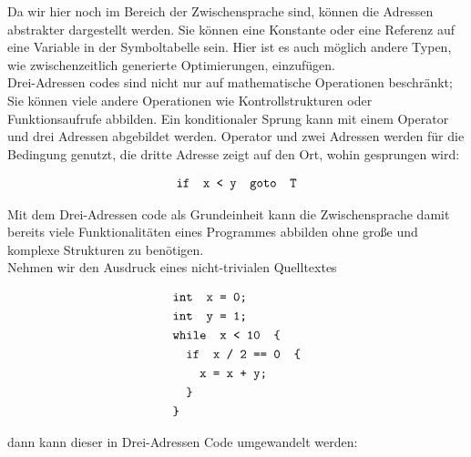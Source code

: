 Da wir hier noch im Bereich der Zwischensprache sind, können die Adressen abstrakter dargestellt werden.
Sie können eine Konstante oder eine Referenz auf eine Variable in der Symboltabelle sein.
Hier ist es auch möglich andere Typen, wie zwischenzeitlich generierte Optimierungen, einzufügen\cite{aho:2006}.\\

Drei-Adressen codes sind nicht nur auf mathematische Operationen beschränkt;
Sie können viele andere Operationen wie Kontrollstrukturen oder Funktionsaufrufe abbilden.
Ein konditionaler Sprung kann mit einem Operator und drei Adressen abgebildet werden.
Operator und zwei Adressen werden für die Bedingung genutzt, die dritte Adresse zeigt auf den Ort, wohin gesprungen wird:

\begin{figure}[H]
  \begin{align*}
    \texttt{\text{if } x < y \text{ goto } T}
  \end{align*}
\end{figure}

Mit dem Drei-Adressen code als Grundeinheit kann die Zwischensprache damit bereits viele Funktionalitäten eines Programmes abbilden ohne große und komplexe Strukturen zu benötigen.\\
Nehmen wir den Ausdruck eines nicht-trivialen Quelltextes

\begin{figure}[H]
  \begin{align*}
    &\texttt{\text{int } x = 0;}\\
    &\texttt{\text{int } y = 1;}\\
    &\texttt{\text{while } x < 10 \text{ \{}}\\
    &\texttt{\quad\text{if } x\ /\ 2\ ==\ 0 \text{ \{}}\\
    &\texttt{\quad\quad x = x + y;}\\
    &\texttt{\quad\text{\}}}\\
    &\texttt{\text{\}}}
  \end{align*}
\end{figure}

dann kann dieser in Drei-Adressen Code umgewandelt werden:




